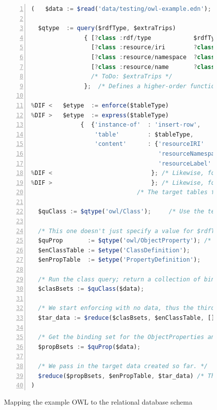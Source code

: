 \documentclass[10pt,letterpaper]{article} %
\providecommand{\DIFmodbegin}{} %
\providecommand{\DIFmodend}{} %
\begin{document}
\begin{figure}[H]
  \caption{Mapping the example OWL to the relational database schema}
  \label{code:mapping-owl-to-rdbms}
\DIFmodbegin
\begin{lstlisting}[language=JavaScript,numberstyle=\scriptsize,basicstyle=\ttfamily\scriptsize,numbers=left,stepnumber=1,breaklines=true,alsolanguage=DIFcode]
  (   $data := $read('data/testing/owl-example.edn');

  $qtype  := query($rdfType, $extraTrips)
               { [?class :rdf/type            $rdfType]
                 [?class :resource/iri        ?class-iri]
                 [?class :resource/namespace  ?class-ns]
                 [?class :resource/name       ?class-name]
                 /* ToDo: $extraTrips */
               };  /* Defines a higher-order function, a template of sorts. */

%DIF <   $etype  := enforce($tableType)
%DIF >   $etype  := express($tableType)
              {  {'instance-of'  : 'insert-row',
                  'table'        : $tableType,
                  'content'      : {'resourceIRI'       : ?class-iri,
                                    'resourceNamespace' : ?class-ns,
                                    'resourceLabel'     : ?class-name}}
%DIF <                            }; /* Likewise, for an enforce template. */
%DIF >                            }; /* Likewise, for an express template. */
                              /* The target tables for objects and relations a very similar. */

  $quClass := $qtype('owl/Class');     /* Use the template, here and the next three assignments. */

  /* This one doesn't just specify a value for $rdfType, but for $extraTrips. */
  $quProp       := $qtype('owl/ObjectProperty'); /* ToDo: ,queryTriples{[?class :rdfs/domain ?domain] [?class :rdfs/range ?range]}); */
  $enClassTable := $etype('ClassDefinition');
  $enPropTable  := $etype('PropertyDefinition');

  /* Run the class query; return a collection of binding objects about classes. */
  $clasBsets := $quClass($data);

  /* We start enforcing with no data, thus the third argument is []. */
  $tar_data := $reduce($clasBsets, $enClassTable, []);

  /* Get the binding set for the ObjectProperties and make similar tables. */
  $propBsets := $quProp($data);

  /* We pass in the target data created so far. */
  $reduce($propBsets, $enPropTable, $tar_data) /* The code block returns the target data. */
)
\end{lstlisting}
\DIFmodend
\end{figure} \vspace{-3em}
\end{document}
